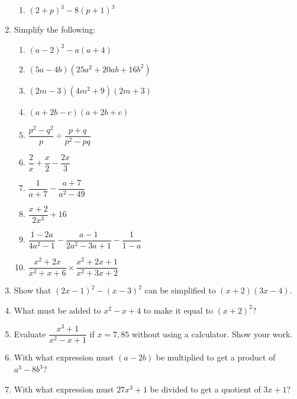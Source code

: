\begin{eocexercises}{}
\begin{enumerate}[itemsep=5pt, label=\textbf{\arabic*}. ]
\begin{multicols}{2}
\begin{enumerate}[itemsep=2pt, label=\textbf{(\alph*)} ]
\item $(2+p)^3- 8(p+1)^3$
\end{enumerate}
\end{multicols}
\item Simplify the following:
\begin{multicols}{2}
\begin{enumerate}[itemsep=4pt, label=\textbf{(\alph*)} ] 
\item ${(a-2)}^{2}-a(a+4)$
\item $(5a-4b)(25{a}^{2}+20ab+16{b}^{2})$
\item $(2m-3)(4{m}^{2}+9)(2m+3)$
\item $(a+2b-c)(a+2b+c)$
\item $\dfrac{{p}^{2}-{q}^{2}}{p}÷\dfrac{p+q}{{p}^{2}-pq}$
\item $\dfrac{2}{x}+\dfrac{x}{2}-\dfrac{2x}{3}$
\item $\dfrac{1}{a+7}-\dfrac{a+7}{a^{2}-49}$
\item $\dfrac{x+2}{2x^{3}} + 16$
\item $\dfrac{1-2a}{4a^{2} -1} - \dfrac{a-1}{2a^{2}-3a+1} - \dfrac{1}{1-a}$
\item $\dfrac{x^{2} + 2x}{x^{2}+ x + 6} \times \dfrac{x^{2} + 2x + 1}{x^{2} + 3x +2}$
\end{enumerate}
\end{multicols}
\item Show that ${(2x-1)}^{2}-{(x-3)}^{2}$ can be simplified to $(x+2)(3x-4)$.
\item What must be added to ${x}^{2}-x+4$ to make it equal to ${(x+2)}^{2}$?
\item Evaluate $\dfrac{x^{3}+1}{x^{2}-x+1}$ if $x=7,85$ without using a calculator. Show your work.
\item With what expression must $(a-2b)$ be multiplied to get a product of $a^3-8b^3$?
\item With what expression must $27x^3+1$ be divided to get a quotient of $3x+1$?
\end{enumerate}

\end{eocexercises}

